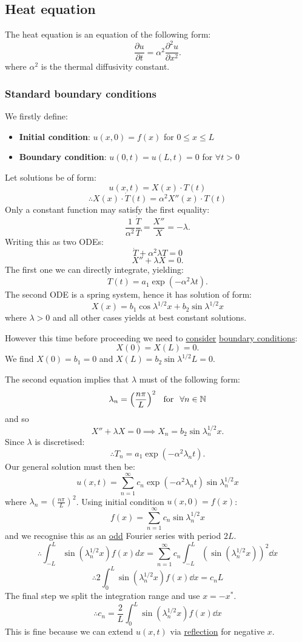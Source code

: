 \documentclass{article}
\begin{document}
\subsection{Heat equation}
The heat equation is an equation of the following form:
$$\frac{\partial u}{\partial t}=\alpha^2\frac{\partial^2 u}{\partial x^2}.$$
where $\alpha^2$ is the thermal diffusivity constant. 

\subsubsection{Standard boundary conditions}
We firstly define:
\begin{itemize}
    \item \textbf{Initial condition}: $u(x,0)=f(x)$ for $0\leq x\leq L$

    \item \textbf{Boundary condition}: $u(0,t)=u(L,t)=0$ for $\forall t>0$
\end{itemize}
Let solutions be of form:
$$u(x,t)=X(x)\cdot T(t)$$
$$\therefore X(x)\cdot \dot{T}(t)=\alpha^2 X''(x)\cdot T(t)$$
Only a constant function may satisfy the first equality:
$$\frac{1}{\alpha^2}\frac{\dot{T}}{T}=\frac{X''}{X}=-\lambda.$$
Writing this as two ODEs:
$$\dot{T}+\alpha^2\lambda T=0$$
$$X''+\lambda X=0.$$
The first one we can directly integrate, yielding:
$$T(t)=a_1\exp\left(-\alpha^2\lambda t\right).$$
The second ODE is a spring system, hence it has solution of form:
$$X(x)=b_1\cos\lambda^{1/2} x+b_2\sin\lambda^{1/2} x$$
where $\lambda>0$ and all other cases yields at best constant solutions.

\newpage

However this time before proceeding we need to \underline{consider}
\underline{boundary conditions}:
$$X(0)=X(L)=0.$$
We find $X(0)=b_1=0$ and $X(L)=b_2\sin\lambda^{1/2} L=0$.

The second equation implies that $\lambda$ must of the following form:
$$\lambda_n=\left(\frac{n\pi}{L}\right)^2
\hspace{0.1in}\text{for}\hspace{0.1in}\forall n\in\mathbb{N}$$
and so
$$X''+\lambda X=0\implies X_n=b_2\sin\lambda_n^{1/2} x.$$
Since $\lambda$ is discretised:
$$\therefore T_n=a_1\exp\left(-\alpha^2\lambda_n t\right).$$
Our general solution must then be:
$$u(x,t)=\sum_{n=1}^{\infty}c_n\exp\left(-\alpha^2\lambda_n t\right)
\sin\lambda_n^{1/2} x$$
where $\lambda_n=\left(\frac{n\pi}{L}\right)^2$. Using initial condition $u(x,0)=f(x)$:
$$f(x)=\sum_{n=1}^{\infty}c_n\sin\lambda_n^{1/2} x$$
and we recognise this as an \underline{odd} Fourier series with period $2L$.
$$\therefore\int_{-L}^{L}\sin(\lambda_n^{1/2} x) f(x)dx=\sum_{n=1}^{\infty}c_n\int_{-L}^{L}\left(
\sin(\lambda_n^{1/2} x)\right)^2\dd x$$
$$\therefore2\int_{0}^{L}\sin(\lambda_n^{1/2} x) f(x)\dd x
=c_n L$$
The final step we split the integration range and use $x=-x^*$.
$$\therefore c_n=\frac{2}{L}\int_{0}^{L}\sin(\lambda_n^{1/2} x) f(x)\dd x$$
This is fine because we can extend $u(x,t)$ via \underline{reflection} for negative $x$.
\end{document}
